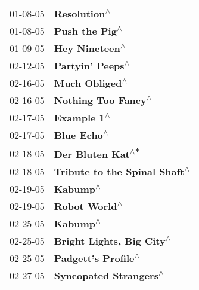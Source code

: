 \begin{supertabular}{p{0.25\columnwidth}p{0.75\columnwidth}}
 01-08-05 &                                                               \textbf{Resolution\textsuperscript{$\wedge$}} \\
 01-08-05 &                                                             \textbf{Push the Pig\textsuperscript{$\wedge$}} \\
 01-09-05 &                                                             \textbf{Hey Nineteen\textsuperscript{$\wedge$}} \\
 02-12-05 &                                                           \textbf{Partyin' Peeps\textsuperscript{$\wedge$}} \\
 02-16-05 &                                                             \textbf{Much Obliged\textsuperscript{$\wedge$}} \\
 02-16-05 &                                                        \textbf{Nothing Too Fancy\textsuperscript{$\wedge$}} \\
 02-17-05 &                                                                \textbf{Example 1\textsuperscript{$\wedge$}} \\
 02-17-05 &                                                                \textbf{Blue Echo\textsuperscript{$\wedge$}} \\
 02-18-05 &                                                          \textbf{Der Bluten Kat\textsuperscript{$\wedge$*}} \\
 02-18-05 &                                              \textbf{Tribute to the Spinal Shaft\textsuperscript{$\wedge$}} \\
 02-19-05 &                                                                   \textbf{Kabump\textsuperscript{$\wedge$}} \\
 02-19-05 &                                                              \textbf{Robot World\textsuperscript{$\wedge$}} \\
 02-25-05 &                                                                   \textbf{Kabump\textsuperscript{$\wedge$}} \\
 02-25-05 &                                                  \textbf{Bright Lights, Big City\textsuperscript{$\wedge$}} \\
 02-25-05 &                                                        \textbf{Padgett's Profile\textsuperscript{$\wedge$}} \\
 02-27-05 &                                                     \textbf{Syncopated Strangers\textsuperscript{$\wedge$}} \\

\end{supertabular}
